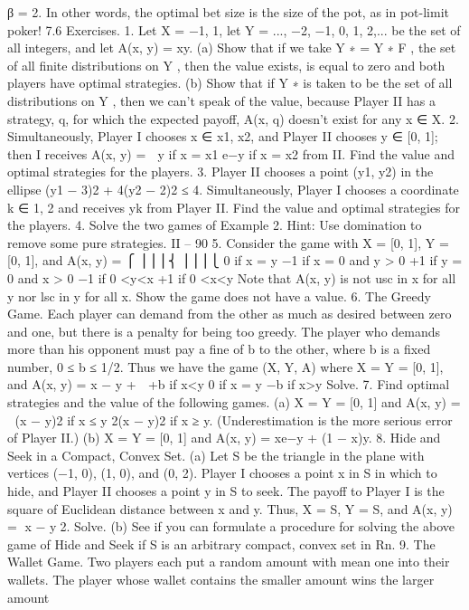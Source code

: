 β = 2. In other words, the optimal bet size is the size of the pot, as in pot-limit poker!
7.6 Exercises.
1. Let X = {−1, 1}, let Y = {..., −2, −1, 0, 1, 2,...} be the set of all integers, and let
A(x, y) = xy.
(a) Show that if we take Y ∗ = Y ∗
F , the set of all finite distributions on Y , then the
value exists, is equal to zero and both players have optimal strategies.
(b) Show that if Y ∗ is taken to be the set of all distributions on Y , then we can’t speak
of the value, because Player II has a strategy, q, for which the expected payoff, A(x, q)
doesn’t exist for any x ∈ X.
2. Simultaneously, Player I chooses x ∈ {x1, x2}, and Player II chooses y ∈ [0, 1]; then
I receives
A(x, y) =  y if x = x1
e−y if x = x2
from II. Find the value and optimal strategies for the players.
3. Player II chooses a point (y1, y2) in the ellipse (y1 − 3)2 + 4(y2 − 2)2 ≤ 4. Simultaneously,
Player I chooses a coordinate k ∈ {1, 2} and receives yk from Player II. Find the
value and optimal strategies for the players.
4. Solve the two games of Example 2. Hint: Use domination to remove some pure
strategies.
II – 90
5. Consider the game with X = [0, 1], Y = [0, 1], and
A(x, y) =
⎧
⎪⎪⎪⎨
⎪⎪⎪⎩
0 if x = y
−1 if x = 0 and y > 0
+1 if y = 0 and x > 0
−1 if 0 <y<x
+1 if 0 <x<y
Note that A(x, y) is not usc in x for all y nor lsc in y for all x. Show the game does not
have a value.
6. The Greedy Game. Each player can demand from the other as much as desired
between zero and one, but there is a penalty for being too greedy. The player who demands
more than his opponent must pay a fine of b to the other, where b is a fixed number,
0 ≤ b ≤ 1/2. Thus we have the game (X, Y, A) where X = Y = [0, 1], and
A(x, y) = x − y +
 +b if x<y
0 if x = y
−b if x>y
Solve.
7. Find optimal strategies and the value of the following games.
(a) X = Y = [0, 1] and A(x, y) =  (x − y)2 if x ≤ y
2(x − y)2 if x ≥ y. (Underestimation is the more
serious error of Player II.)
(b) X = Y = [0, 1] and A(x, y) = xe−y + (1 − x)y.
8. Hide and Seek in a Compact, Convex Set. (a) Let S be the triangle in the
plane with vertices (−1, 0), (1, 0), and (0, 2). Player I chooses a point x in S in which to
hide, and Player II chooses a point y in S to seek. The payoff to Player I is the square
of Euclidean distance between x and y. Thus, X = S, Y = S, and A(x, y) = x − y2.
Solve.
(b) See if you can formulate a procedure for solving the above game of Hide and Seek
if S is an arbitrary compact, convex set in Rn.
9. The Wallet Game. Two players each put a random amount with mean one into
their wallets. The player whose wallet contains the smaller amount wins the larger amount
